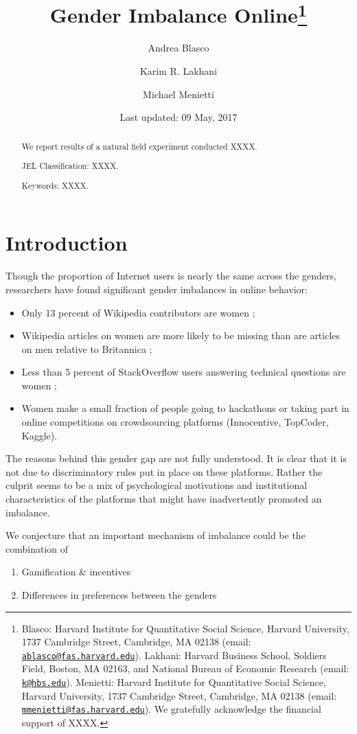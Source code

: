 \documentclass[12pt, titlepage]{article}
\institute{}
\title{Gender Imbalance Online\thanks{Blasco: Harvard Institute for Quantitative Social Science, Harvard
University, 1737 Cambridge Street, Cambridge, MA 02138 (email:
\href{mailto:ablasco@fas.harvard.edu}{\nolinkurl{ablasco@fas.harvard.edu}}).
Lakhani: Harvard Business School, Soldiers Field, Boston, MA 02163, and
National Bureau of Economic Research (email:
\href{mailto:k@hbs.edu}{\nolinkurl{k@hbs.edu}}). Menietti: Harvard
Institute for Quantitative Social Science, Harvard University, 1737
Cambridge Street, Cambridge, MA 02138 (email:
\href{mailto:mmenietti@fas.harvard.edu}{\nolinkurl{mmenietti@fas.harvard.edu}}).
We gratefully acknowledge the financial support of XXXX.}}
\author{Andrea Blasco \and Karim R. Lakhani \and Michael Menietti}
\date{Last updated: 09 May, 2017}
\providecommand{\tightlist}{%
  \setlength{\itemsep}{0pt}\setlength{\parskip}{0pt}}
\begin{document}
\maketitle
\begin{abstract}
We report results of a natural field experiment conducted XXXX.

\smallskip\noindent 
JEL Classification: XXXX.

\smallskip\noindent 
Keywords: XXXX.
\end{abstract}


\clearpage

\section{Introduction}\label{introduction}

Though the proportion of Internet users is nearly the same across the
genders, researchers have found significant gender imbalances in online
behavior:

\begin{itemize}
\tightlist
\item
  Only 13 percent of Wikipedia contributors are women
  \citep{hill2013wikipedia};
\item
  Wikipedia articles on women are more likely to be missing than are
  articles on men relative to Britannica \citep{reagle2011gender};
\item
  Less than 5 percent of StackOverflow users answering technical
  questions are women \citep{vasilescu2012gender};
\item
  Women make a small fraction of people going to hackathons or taking
  part in online competitions on crowdsourcing platforms (Innocentive,
  TopCoder, Kaggle).
\end{itemize}

The reasons behind this gender gap are not fully understood. It is clear
that it is not due to discriminatory rules put in place on these
platforms. Rather the culprit seems to be a mix of psychological
motivations and institutional characteristics of the platforms that
might have inadvertently promoted an imbalance.

We conjecture that an important mechanism of imbalance could be the
combination of

\begin{enumerate}
\def\labelenumi{\arabic{enumi}.}
\tightlist
\item
  Gamification \& incentives
\item
  Differences in preferences between the genders
\end{enumerate}
\end{document}
